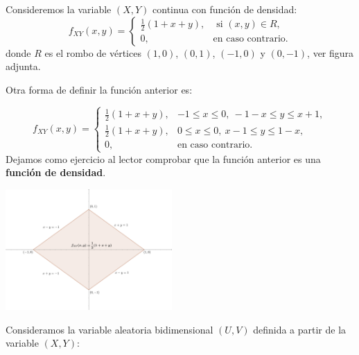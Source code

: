 \documentclass[
  letterpaper,
  DIV=11,
  numbers=noendperiod]{scrreprt}
\begin{document}
Consideremos la variable \((X,Y)\) continua con función de densidad: \[
f_{XY}(x,y)=\begin{cases}
\frac{1}{2}(1+x+y), & \mbox{ si }(x,y)\in R, \\
0, & \mbox{en caso contrario.}
\end{cases}
\] donde \(R\) es el rombo de vértices \((1,0)\), \((0,1)\), \((-1,0)\)
y \((0,-1)\), ver figura adjunta.

Otra forma de definir la función anterior es:

\[
f_{XY}(x,y)=\begin{cases}
\frac{1}{2}(1+x+y), & -1\leq x\leq 0,\ -1-x\leq y\leq x+1, \\
\frac{1}{2}(1+x+y), & 0\leq x\leq 0,\ x-1\leq y\leq 1-x, \\
0, & \mbox{en caso contrario.}
\end{cases}
\] Dejamos como ejercicio al lector comprobar que la función anterior es
una \textbf{función de densidad}.

\includegraphics[width=2.5in,height=\textheight]{Images/EjTranLineal.png}

Consideramos la variable aleatoria bidimensional \((U,V)\) definida a
partir de la variable \((X,Y)\):
\end{document}
